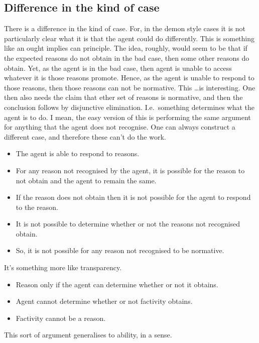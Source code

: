 \documentclass[10pt]{article}
\begin{document}
\subsection{Difference in the kind of case}
\label{sec:difference-kind-case}

There is a difference in the kind of case.
For, in the demon style cases it is not particularly clear what it is that the agent could do differently.
This is something like an ought implies can principle.
The idea, roughly, would seem to be that if the expected reasons do not obtain in the bad case, then some other reasons do obtain.
Yet, as the agent is in the bad case, then agent is unable to access whatever it is those reasons promote.
Hence, as the agent is unable to respond to those reasons, then those reasons can not be normative.
This \dots is interesting.
One then also needs the claim that ether set of reasons is normative, and then the conclusion follows by disjunctive elimination.
I.e.\ something determines what the agent is to do.
I mean, the easy version of this is performing the same argument for anything that the agent does not recognise.
One can always construct a different case, and therefore these can't do the work.

\begin{itemize}
\item The agent is able to respond to reasons.
\item For any reason not recognised by the agent, it is possible for the reason to not obtain and the agent to remain the same.
\item If the reason does not obtain then it is not possible for the agent to respond to the reason.
\item It is not possible to determine whether or not the reasons not recognised obtain.
\item So, it is not possible for any reason not recognised to be normative.
\end{itemize}

It's something more like transparency.

\begin{itemize}
\item Reason only if the agent can determine whether or not it obtains.
\item Agent cannot determine whether or not factivity obtains.
\item Factivity cannot be a reason.
\end{itemize}

This sort of argument generalises to ability, in a sense.
\end{document}

